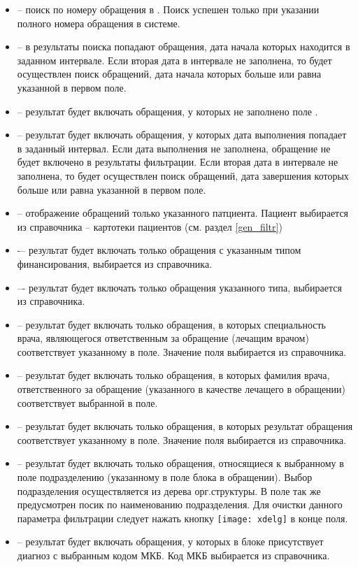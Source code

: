 \begin{itemize}
 \item {} -- поиск по номеру обращения в \tmisp. Поиск успешен только при указании полного номера обращения в системе.
 \item {} -- в результаты поиска попадают обращения, дата начала которых находится в заданном интервале. Если вторая дата в интервале не заполнена, то будет осуществлен поиск обращений, дата начала которых больше или равна указанной в первом поле.
 \item {} -- результат будет включать обращения, у которых не заполнено поле .
 \item {} -- результат будет включать обращения, у которых дата выполнения попадает в заданный интервал. Если дата выполнения не заполнена, обращение не будет включено в результаты фильтрации. Если вторая дата в интервале не заполнена, то будет осуществлен поиск обращений, дата завершения которых больше или равна указанной в первом поле.
 \item {} -- отображение обращений только указанного патциента. Пациент выбирается из справочника -- картотеки пациентов (см. раздел \ref{gen_filtr})
 \item {} -– результат будет включать только обращения с указанным типом финансирования, выбирается из справочника.
 \item {} –- результат будет включать только обращения указанного типа, выбирается из справочника.
 \item {} -- результат будет включать только обращения, в которых специальность врача, являющегося ответственным за обращение (лечащим врачом) соответствует указанному в поле. Значение поля выбирается из справочника.
 \item {} -- результат будет включать только обращения, в которых фамилия врача, ответственного за обращение (указанного в качестве лечащего в обращении) соответствует выбранной в поле.
 \item {} -- результат будет включать только обращения, в которых результат обращения соответствует указанному в поле. Значение поля выбирается из справочника.
 \item {} -- результат будет включать только обращения, относящиеся к выбранному в поле подразделению (указанному в поле  блока  в обращении). Выбор подразделения осуществляется из дерева орг.структуры. В поле так же предусмотрен посик по наименованию подразделения. Для очистки данного параметра фильтрации следует нажать кнопку  \texttt{[image: xdelg]} в конце поля.
 \item {} -- результат будет включать обращения, у которых в блоке  присутствует диагноз с выбранным кодом МКБ. Код МКБ выбирается из справочника.  
\end{itemize}

